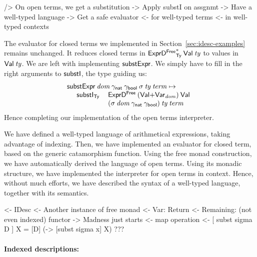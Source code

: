 \begin{wstructure}
    /> On open terms, we get a substitution
        -> Apply substI on assgnmt
            -> Have a well-typed language
            -> Get a safe evaluator 
                <- for well-typed terms 
                <- in well-typed contexts
\end{wstructure}

The evaluator for closed terms we implemented in
Section~\ref{sec:idesc-examples} remains unchanged. It reduces closed
terms in $\FreeIMonad{\HExprFreeD}{\Ty}{\SYMBVal}\: \V{ty}$ to values in
$\Val{\V{ty}}$. We are left with implementing $\substH$. We simply
have to fill in the right arguments to $\substI$, the type guiding us:
%
\[\stk{
\substH\: \V{dom}\:
          \gammaNat\: \gammaBool\:
          \V{\sigma}\: 
          \V{ty}\: 
          \V{term} \mapsto  \\
\;\;\ \begin{array}{ll}
       \substI_{\Ty}\: &  \HExprFreeD\: 
                         (\SUM{\SYMBVal}{\Var{\V{dom}}{}})\: 
                         \SYMBVal \\
                      &
                        (\V{\sigma}\: \V{dom}\: \gammaNat\: \gammaBool)\:
                        \V{ty}\:
                        \V{term}
      \end{array}
}\]
%
Hence completing our implementation of the open terms interpreter. 

We have defined a well-typed language of arithmetical expressions,
taking advantage of indexing. Then, we have implemented an evaluator
for closed term, based on the generic catamorphism function. Using the
free monad construction, we have automatically derived the language of
open terms. Using its monadic structure, we have implemented the
interpreter for open terms in context. Hence, without much efforts, we
have described the syntax of a well-typed language, together with its
semantics.

\begin{wstructure}
<- IDesc
    <- Another instance of free monad
        <- Var: Return
        <- Remaining: (not even indexed) functor
    -> Madness just starts
        <- map operation
        <- [ subst sigma D ] X = [D] (\x -> [subst sigma x] X)
        ???
\end{wstructure}

\paragraph{Indexed descriptions:}

